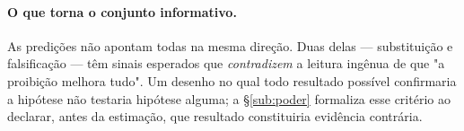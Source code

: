 \paragraph{O que torna o conjunto informativo.} As predições não apontam todas na
mesma direção. Duas delas --- substituição e falsificação --- têm sinais
esperados que \emph{contradizem} a leitura ingênua de que "a proibição melhora
tudo". Um desenho no qual todo resultado possível confirmaria a hipótese não
testaria hipótese alguma; a §\ref{sub:poder} formaliza esse critério ao declarar,
antes da estimação, que resultado constituiria evidência contrária.
